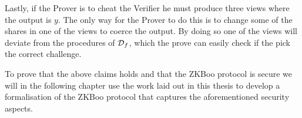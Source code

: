 Lastly, if the Prover is to cheat the Verifier he must produce three views where
the output is $y$. The only way for the Prover to do this is to change some of
the shares in one of the views to coerce the output. By doing so one of the
views will deviate from the procedures of $\mathcal{D}_{f}$, which the prove can easily
check if the pick the correct challenge.

To prove that the above claims holds and that the ZKBoo protocol is secure we will
in the following chapter use the work laid out in this thesis to develop a
formalisation of the ZKBoo protocol that captures the aforementioned security aspects.

